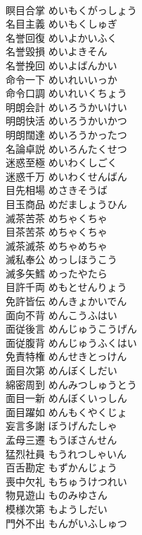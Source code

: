 \documentclass[8pt]{extreport}
\begin{document}
\begin{CJK}{UTF8}{min}
\\	瞑目合掌	めいもくがっしょう	
\\	名目主義	めいもくしゅぎ	
\\	名誉回復	めいよかいふく	
\\	名誉毀損	めいよきそん	
\\	名誉挽回	めいよばんかい	
\\	命令一下	めいれいいっか	
\\	命令口調	めいれいくちょう	
\\	明朗会計	めいろうかいけい	
\\	明朗快活	めいろうかいかつ	
\\	明朗闊達	めいろうかったつ	
\\	名論卓説	めいろんたくせつ	
\\	迷惑至極	めいわくしごく	
\\	迷惑千万	めいわくせんばん	
\\	目先相場	めさきそうば	
\\	目玉商品	めだましょうひん	
\\	滅茶苦茶	めちゃくちゃ	
\\	目茶苦茶	めちゃくちゃ	
\\	滅茶滅茶	めちゃめちゃ	
\\	滅私奉公	めっしほうこう	
\\	滅多矢鱈	めったやたら	
\\	目許千両	めもとせんりょう	
\\	免許皆伝	めんきょかいでん	
\\	面向不背	めんこうふはい	
\\	面従後言	めんじゅうこうげん	
\\	面従腹背	めんじゅうふくはい	
\\	免責特権	めんせきとっけん	
\\	面目次第	めんぼくしだい	
\\	綿密周到	めんみつしゅうとう	
\\	面目一新	めんぼくいっしん	
\\	面目躍如	めんもくやくじょ	
\\	妄言多謝	ぼうげんたしゃ	
\\	孟母三遷	もうぼさんせん	
\\	猛烈社員	もうれつしゃいん	
\\	百舌勘定	もずかんじょう	
\\	喪中欠礼	もちゅうけつれい	
\\	物見遊山	ものみゆさん	
\\	模様次第	もようしだい	
\\	門外不出	もんがいふしゅつ	

\end{CJK}
\end{document}
